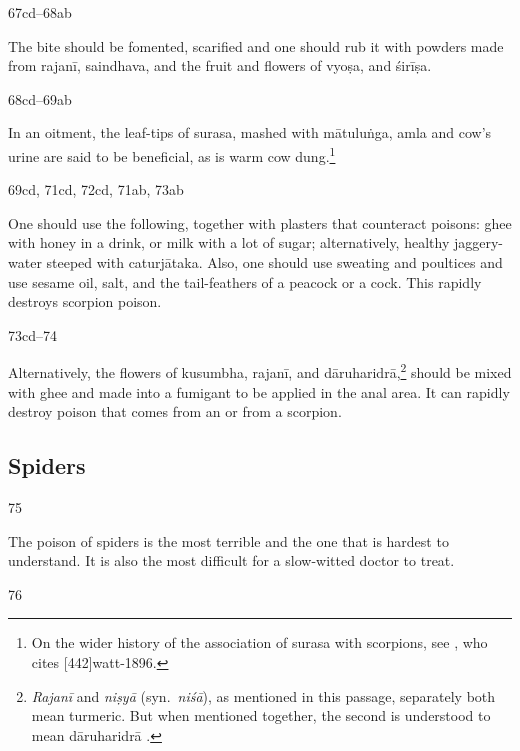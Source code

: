 \begin{translation}
\item[67cd--68ab]

The bite should be fomented, scarified and one should rub it with
powders made from  \gls{rajanī}, \gls{saindhava}, and the fruit and
flowers of \gls{vyoṣa}, and \gls{śirīṣa}.

\item[68cd--69ab]

In an oitment, the leaf-tips of \gls{surasa}, mashed with
\gls{mātuluṅga}, \gls{amla} and cow's urine are said to be beneficial,
as is warm cow dung.\footnote{On the wider history of the
    association of \gls{surasa} with scorpions, see \citet[40 et
    passim]{simo-1998}, who cites [442]{watt-1896}.} 

\item[69cd, 71cd, 72cd, 71ab, 73ab]

One should use the following, together with plasters that counteract poisons:
ghee with honey in a drink, or milk with a lot of sugar; alternatively, healthy 
jaggery-water steeped with \gls{caturjātaka}. Also, one should use sweating 
and poultices and use sesame oil, salt, and the tail-feathers of a peacock or a 
cock. This  rapidly destroys scorpion poison.

\item[73cd--74]

Alternatively, the flowers of \gls{kusumbha}, \gls{rajanī}, and
\gls{dāruharidrā},\footnote{\emph{Rajanī} and \emph{niṣyā} (syn.\
    \emph{niśā}), as mentioned in this passage, separately both mean
    turmeric.  But when mentioned together, the second is understood to
    mean \gls{dāruharidrā} \citep[227]{gvdb}.} should be mixed with ghee
    and made into a fumigant to be applied in the anal area.  It can
    rapidly destroy poison that comes from an \se{kīṭa}{insect} or from a
    scorpion.


 
 \subsection{Spiders}
 
 \item[75]
 
 The poison of spiders is the most terrible and the one that is
hardest to understand.  It is also the most difficult for a
slow-witted doctor to treat.

\item[76]


\end{translation}

